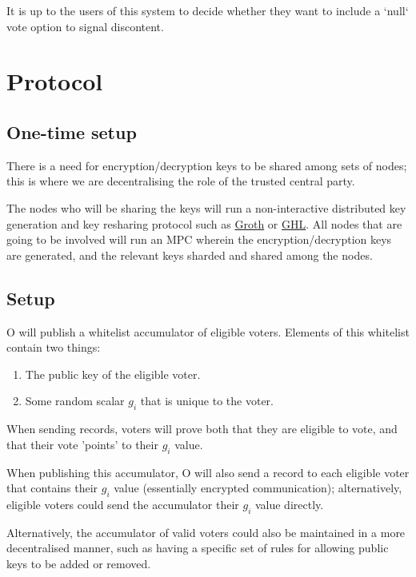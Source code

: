 \documentclass{article}
\begin{document}
It is up to the users of this system to decide whether they want to include a `null` vote option to signal discontent.

\section{Protocol}
\subsection{One-time setup}
There is a need for encryption/decryption keys to be shared among sets of nodes; this is where we are decentralising the role of the trusted central party.

The nodes who will be sharing the keys will run a non-interactive distributed key generation and key resharing protocol such as  \href{https://eprint.iacr.org/2021/339.pdf}{Groth} or \href{https://eprint.iacr.org/2021/1397.pdf}{GHL}. All nodes that are going to be involved will run an MPC wherein the encryption/decryption keys are generated, and the relevant keys sharded and shared among the nodes.

\subsection{Setup}
O will publish a whitelist accumulator of eligible voters. Elements of this whitelist contain two things:
\begin{enumerate}
    \item The public key of the eligible voter.
    \item Some random scalar $g_i$ that is unique to the voter.
\end{enumerate}

When sending records, voters will prove both that they are eligible to vote, and that their vote 'points' to their $g_i$ value.

When publishing this accumulator, O will also send a record to each eligible voter that contains their $g_i$ value (essentially encrypted communication); alternatively, eligible voters could send the accumulator their $g_i$ value directly.

Alternatively, the accumulator of valid voters could also be maintained in a more decentralised manner, such as having a specific set of rules for allowing public keys to be added or removed.
\end{document}
